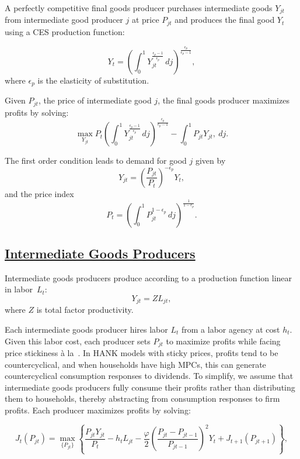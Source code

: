 \documentclass[\PathToRoot/\ProjectName]{subfiles}
\begin{document}
A perfectly competitive final goods producer purchases intermediate goods \( Y_{jt} \) from intermediate good producer $j$ at price \( P_{jt} \) and produces the final good \( Y_t \) using a CES production function:

\[
  Y_{t} = \left(\int_{0}^{1} Y_{jt}^{\frac{\epsilon_{p}-1}{\epsilon_{p}}}\, dj\right)^{\frac{\epsilon_{p}}{\epsilon_{p}-1}},
\]
where $\epsilon_{p}$ is the elasticity of substitution.

Given $P_{jt}$, the price of intermediate good $j$, the final goods producer maximizes profits by solving:
\[
  \max_{Y_{jt}} P_{t} \left(\int_{0}^{1} Y_{jt}^{\frac{\epsilon_{p}-1}{\epsilon_{p}}}\, dj\right)^{\frac{\epsilon_{p}}{\epsilon_{p}-1}} - \int_{0}^{1} P_{jt} Y_{jt} ,\ dj.
\]

The first order condition leads to demand for good $j$ given by
\[
  Y_{jt} = \left(\frac {P_{jt}}{P_{t}}\right)^{- \epsilon_{p}} Y_{t},
\]
and the price index
\[
  P_{t} = \left(\int_{0}^{1} P_{jt}^{1-\epsilon_{p}}\,dj \right )^{\frac{1}{1-\epsilon_{p}}}.
\]

\subsection{\href{https://econ-ark.github.io/HAFiscal/\#sec:hank-intermediate-goods-producers}{Intermediate Goods Producers}}\label{sec:hank-intermediate-goods-producers}

Intermediate goods producers produce according to a production function linear in labor~$L_{t}$:
\[
  Y_{jt} =  Z L_{jt},
\]
where $Z$ is total factor productivity.

Each intermediate goods producer hires labor \( L_t \) from a labor agency at cost \( h_t \). Given this labor cost, each producer sets \( P_{jt} \) to maximize profits while facing price stickiness à la~\cite{Rotemberg1982}. In HANK models with sticky prices, profits tend to be countercyclical, and when households have high MPCs, this can generate countercyclical consumption responses to dividends. To simplify, we assume that intermediate goods producers fully consume their profits rather than distributing them to households, thereby abstracting from consumption responses to firm profits. Each producer maximizes profits by solving:

\[
  J_{t}\left(P_{jt}\right) = \max_{\{P_{jt}\}} \left\{\frac{P_{jt}Y_{jt}}{P_{t}} - h_{t} L_{jt} -  \frac{\varphi}{2}\left( \frac{P_{jt} - P_{jt-1}}{P_{jt-1}} \right)^{2} Y_{t}  + J_{t+1}\left(P_{jt+1}\right) \right\},
\]
\end{document}
